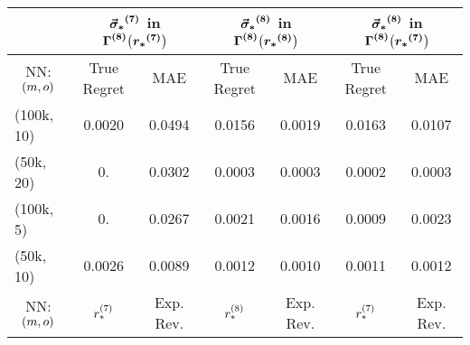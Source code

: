 \begin{table}[ht]
\centering
\begin{tabular}{l|cc|cc|cc|}
& \multicolumn{2}{c|}{$\boldsymbol{\vec{\sigma}_*}^{\textbf{(7)}}$ in $\mathbf{\boldsymbol{\Gamma}^{\textbf{(8)}}\bigl(\boldsymbol{r_*}^{\textbf{(7)}}\bigr)}$}
& \multicolumn{2}{c|}{$\boldsymbol{\vec{\sigma}_*}^{\textbf{(8)}}$ in $\mathbf{\boldsymbol{\Gamma}^{\textbf{(8)}}\bigl(\boldsymbol{r_*}^{\textbf{(8)}}\bigr)}$}
& \multicolumn{2}{c|}{$\boldsymbol{\vec{\sigma}_*}^{\textbf{(8)}}$ in $\mathbf{\boldsymbol{\Gamma}^{\textbf{(8)}}\bigl(\boldsymbol{r_*}^{\textbf{(7)}}\bigr)}$} \\
\hline
\multicolumn{1}{c|}{NN: $(m, o)$}
 & \multicolumn{1}{c}{True Regret} & \multicolumn{1}{c|}{MAE}
 & \multicolumn{1}{c}{True Regret} & \multicolumn{1}{c|}{MAE}
 & \multicolumn{1}{c}{True Regret} & \multicolumn{1}{c|}{MAE} \\
\hline
(100k, 10) & 0.0020 & 0.0494 & 0.0156 & 0.0019 & 0.0163 & 0.0107 \\
(50k, 20)  & 0.     & 0.0302 & 0.0003 & 0.0003 & 0.0002 & 0.0003 \\
(100k, 5)  & 0.     & 0.0267 & 0.0021 & 0.0016 & 0.0009 & 0.0023 \\
(50k, 10)  & 0.0026 & 0.0089 & 0.0012 & 0.0010 & 0.0011 & 0.0012 \\
\hline 
\hline
\multicolumn{1}{c|}{\rule{0pt}{12pt} NN: $(m, o)$}
 & \multicolumn{1}{c}{\rule{0pt}{12pt} $r_*^{(7)}$} & \multicolumn{1}{c|}{\rule{0pt}{12pt} Exp. Rev.}
 & \multicolumn{1}{c}{\rule{0pt}{12pt} $r_*^{(8)}$} & \multicolumn{1}{c|}{\rule{0pt}{12pt} Exp. Rev.}
 & \multicolumn{1}{c}{\rule{0pt}{12pt} $r_*^{(7)}$} & \multicolumn{1}{c|}{\rule{0pt}{12pt} Exp. Rev.} \\
\hline

\end{tabular}
\end{table}

